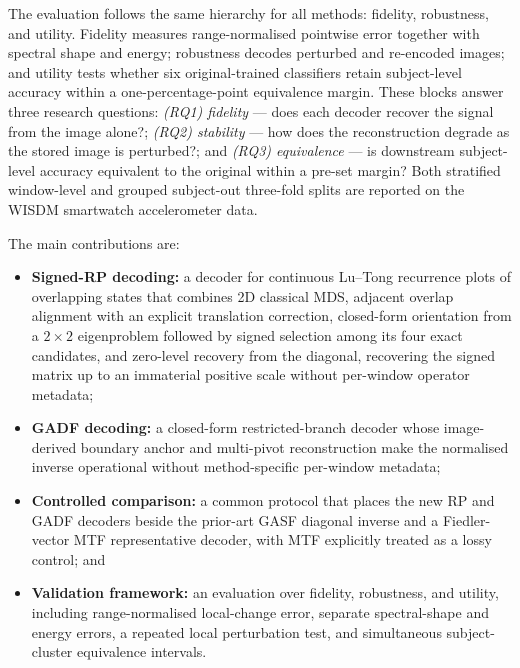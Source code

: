\documentclass[5p]{elsarticle}
\begin{document}
The evaluation follows the same hierarchy for all methods: fidelity, robustness, and utility. Fidelity measures range-normalised pointwise error together with spectral shape and energy; robustness decodes perturbed and re-encoded images; and utility tests whether six original-trained classifiers retain subject-level accuracy within a one-percentage-point equivalence margin. These blocks answer three research questions: \emph{(RQ1) fidelity} --- does each decoder recover the signal from the image alone?; \emph{(RQ2) stability} --- how does the reconstruction degrade as the stored image is perturbed?; and \emph{(RQ3) equivalence} --- is downstream subject-level accuracy equivalent to the original within a pre-set margin? Both stratified window-level and grouped subject-out three-fold splits are reported on the WISDM smartwatch accelerometer data.

The main contributions are:

\begin{itemize}
    \item \textbf{Signed-RP decoding:} a decoder for continuous Lu--Tong recurrence plots of overlapping states that combines 2D classical MDS, adjacent overlap alignment with an explicit translation correction, closed-form orientation from a \(2\times2\) eigenproblem followed by signed selection among its four exact candidates, and zero-level recovery from the diagonal, recovering the signed matrix up to an immaterial positive scale without per-window operator metadata;
    \item \textbf{GADF decoding:} a closed-form restricted-branch decoder whose image-derived boundary anchor and multi-pivot reconstruction make the normalised inverse operational without method-specific per-window metadata;
    \item \textbf{Controlled comparison:} a common protocol that places the new RP and GADF decoders beside the prior-art GASF diagonal inverse and a Fiedler-vector MTF representative decoder, with MTF explicitly treated as a lossy control; and
    \item \textbf{Validation framework:} an evaluation over fidelity, robustness, and utility, including range-normalised local-change error, separate spectral-shape and energy errors, a repeated local perturbation test, and simultaneous subject-cluster equivalence intervals.
\end{itemize}
\end{document}

